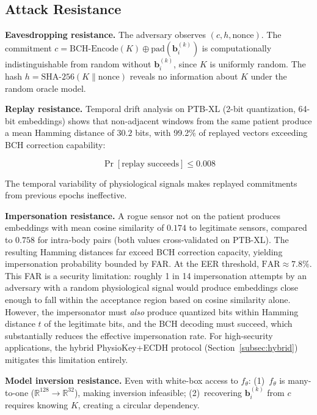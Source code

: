 \documentclass[sensors,article,submit,pdftex,moreauthors]{Definitions/mdpi}
\begin{document}
\subsection{Attack Resistance}
\label{subsec:attack_resistance}

\textbf{Eavesdropping resistance.} The adversary observes $(c, h, \text{nonce})$. The commitment $c = \text{BCH-Encode}(K) \oplus \text{pad}(\mathbf{b}_i^{(k)})$ is computationally indistinguishable from random without $\mathbf{b}_i^{(k)}$, since $K$ is uniformly random. The hash $h = \text{SHA-256}(K \| \text{nonce})$ reveals no information about $K$ under the random oracle model.

\textbf{Replay resistance.} Temporal drift analysis on PTB-XL (2-bit quantization, 64-bit embeddings) shows that non-adjacent windows from the same patient produce a mean Hamming distance of $30.2$ bits, with 99.2\% of replayed vectors exceeding BCH correction capability:

\begin{equation}
\Pr[\text{replay succeeds}] \leq 0.008
\end{equation}

The temporal variability of physiological signals makes replayed commitments from previous epochs ineffective.

\textbf{Impersonation resistance.} A rogue sensor not on the patient produces embeddings with mean cosine similarity of $0.174$ to legitimate sensors, compared to $0.758$ for intra-body pairs (both values cross-validated on PTB-XL). The resulting Hamming distances far exceed BCH correction capacity, yielding impersonation probability bounded by FAR. At the EER threshold, $\text{FAR} \approx 7.8\%$. This FAR is a security limitation: roughly 1 in 14 impersonation attempts by an adversary with a random physiological signal would produce embeddings close enough to fall within the acceptance region based on cosine similarity alone. However, the impersonator must \textit{also} produce quantized bits within Hamming distance $t$ of the legitimate bits, and the BCH decoding must succeed, which substantially reduces the effective impersonation rate. For high-security applications, the hybrid PhysioKey+ECDH protocol (Section~\ref{subsec:hybrid}) mitigates this limitation entirely.

\textbf{Model inversion resistance.} Even with white-box access to $f_\theta$: (1)~$f_\theta$ is many-to-one ($\mathbb{R}^{128} \rightarrow \mathbb{R}^{32}$), making inversion infeasible; (2)~recovering $\mathbf{b}_i^{(k)}$ from $c$ requires knowing $K$, creating a circular dependency.
\end{document}
